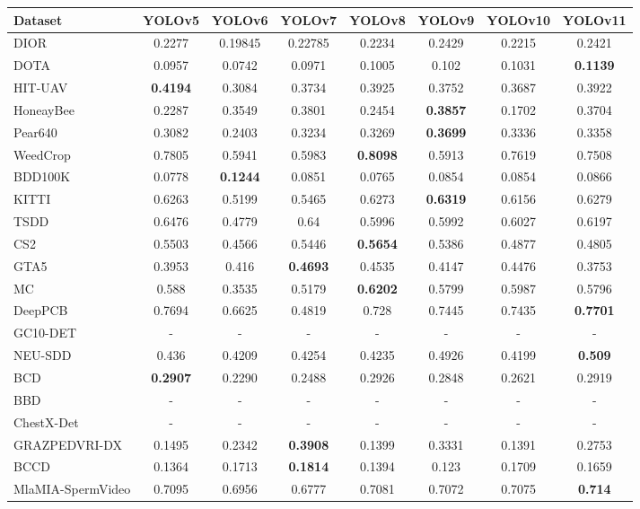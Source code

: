 \documentclass[runningheads]{llncs}
\begin{document}
\begin{table}[htbp]
\centering
\begin{tabular}{lccccccc}
\hline
Dataset & YOLOv5 & YOLOv6 & YOLOv7 & YOLOv8 & YOLOv9 & YOLOv10 & YOLOv11 \\
\hline
DIOR & 0.2277& 0.19845& 0.22785& 0.2234& 0.2429& 0.2215& 0.2421
\\
DOTA & 0.0957& 0.0742 & 0.0971 & 0.1005 & 0.102 & 0.1031 & \textbf{0.1139} \\
HIT-UAV& \textbf{0.4194} & 0.3084 & 0.3734 & 0.3925 & 0.3752 & 0.3687 & 0.3922 \\
\hline
HoneayBee & 0.2287 & 0.3549 & 0.3801 & 0.2454 & \textbf{0.3857} & 0.1702 & 0.3704 \\
Pear640 & 0.3082 & 0.2403 & 0.3234 & 0.3269 & \textbf{0.3699} & 0.3336 & 0.3358 \\
WeedCrop & 0.7805 & 0.5941 & 0.5983 & \textbf{0.8098} & 0.5913 & 0.7619 & 0.7508 \\
\hline
BDD100K & 0.0778 & \textbf{0.1244} & 0.0851 & 0.0765 & 0.0854 & 0.0854 & 0.0866 \\
KITTI & 0.6263 & 0.5199 & 0.5465 & 0.6273 & \textbf{0.6319} & 0.6156 & 0.6279 \\
TSDD & 0.6476 & 0.4779 & 0.64 & 0.5996 & 0.5992 & 0.6027 & 0.6197 \\
\hline
CS2 & 0.5503 & 0.4566 & 0.5446 & \textbf{0.5654} & 0.5386 & 0.4877 & 0.4805 \\
GTA5 & 0.3953 & 0.416 & \textbf{0.4693} & 0.4535 & 0.4147 & 0.4476 & 0.3753 \\
MC & 0.588 & 0.3535 & 0.5179 & \textbf{0.6202} & 0.5799 & 0.5987 & 0.5796 \\
\hline
DeepPCB & 0.7694 & 0.6625 & 0.4819 & 0.728 & 0.7445 & 0.7435 & \textbf{0.7701} \\
GC10-DET & - & - & - & - & - & - & - \\
NEU-SDD & 0.436 & 0.4209 & 0.4254 & 0.4235 & 0.4926 & 0.4199 & \textbf{0.509} \\
\hline
BCD & \textbf{0.2907} & 0.2290 & 0.2488 & 0.2926 & 0.2848 & 0.2621 & 0.2919 \\
BBD & - & - & - & - & - & - & - \\
ChestX-Det & - & - & - & - & - & - & - \\
GRAZPEDVRI-DX & 0.1495 & 0.2342 & \textbf{0.3908} & 0.1399 & 0.3331 & 0.1391 & 0.2753 \\
\hline
BCCD & 0.1364 & 0.1713 & \textbf{0.1814} & 0.1394 & 0.123 & 0.1709 & 0.1659 \\
MlaMIA-SpermVideo & 0.7095 & 0.6956 & 0.6777 & 0.7081 & 0.7072 & 0.7075 & \textbf{0.714} \\

\end{tabular}
\end{table}
\end{document}
